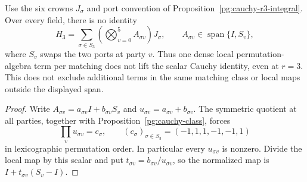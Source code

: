 \begin{proposition}
\label{pg:cauchy-commutant}
Use the six crowns $J_\sigma$ and port convention of
Proposition~\ref{pg:cauchy-r3-integral}. Over every field, there is no identity
\[
 H_3=\sum_{\sigma\in S_3}
       \left(\bigotimes_{v=0}^5 A_{\sigma v}\right)J_\sigma,
 \qquad A_{\sigma v}\in\operatorname{span}\{I,S_v\},
 \tag{PG-CAUCHY-six}
\]
where $S_v$ swaps the two ports at party $v$. Thus one dense local
permutation-algebra term per matching does not lift the scalar Cauchy
identity, even at $r=3$. This does not exclude additional terms in the
same matching class or local maps outside the displayed span.
\end{proposition}
\begin{proof}
Write $A_{\sigma v}=a_{\sigma v}I+b_{\sigma v}S_v$ and
$u_{\sigma v}=a_{\sigma v}+b_{\sigma v}$. The symmetric quotient at all
parties, together with Proposition~\ref{pg:cauchy-class}, forces
\[
 \prod_vu_{\sigma v}=c_\sigma,
 \qquad(c_\sigma)_{\sigma\in S_3}=(-1,1,1,-1,-1,1)
\]
in lexicographic permutation order. In particular every $u_{\sigma v}$
is nonzero. Divide the local map by this scalar and put
$t_{\sigma v}=b_{\sigma v}/u_{\sigma v}$, so the normalized map is
$I+t_{\sigma v}(S_v-I)$.


\end{proof}
